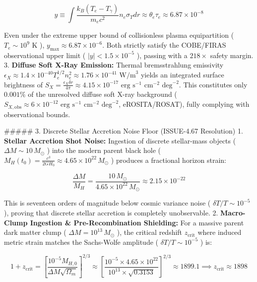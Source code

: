 \documentclass[11pt,a4paper]{article}
\theoremstyle{definition}
\theoremstyle{remark}
\begin{document}
\begin{equation}
y \equiv \int \frac{k_B (T_e - T_\gamma)}{m_e c^2} n_e \sigma_T dr \approx \theta_e \tau_e \approx 6.87 \times 10^{-8}
\end{equation}


Even under the extreme upper bound of collisionless plasma equipartition ( $T_e \sim 10^9\text{ K}$ ), $y_{\text{max}} \approx 6.87 \times 10^{-6}$. Both strictly satisfy the COBE/FIRAS observational upper limit ( $|y| < 1.5 \times 10^{-5}$ ), passing with a $218\times$ safety margin.
3. \textbf{Diffuse Soft X-Ray Emission:} Thermal bremsstrahlung emissivity $\epsilon_X \approx 1.4 \times 10^{-40} T_e^{1/2} n_e^2 \approx 1.76 \times 10^{-41}\text{ W/m}^3$ yields an integrated surface brightness of $S_X = \frac{\epsilon_X \delta r}{4\pi} \approx 4.15 \times 10^{-17}\text{ erg s}^{-1}\text{ cm}^{-2}\text{ deg}^{-2}$. This constitutes only $0.001\%$ of the unresolved diffuse soft X-ray background ( $S_{X, \text{obs}} \approx 6 \times 10^{-12}\text{ erg s}^{-1}\text{ cm}^{-2}\text{ deg}^{-2}$, eROSITA/ROSAT), fully complying with observational bounds.

\#\#\#\#\# 3. Discrete Stellar Accretion Noise Floor (ISSUE-4.67 Resolution)
1. \textbf{Stellar Accretion Shot Noise:} Ingestion of discrete stellar-mass objects ( $\Delta M \sim 10 \, M_\odot$ ) into the modern parent black hole ( $M_H(t_0) = \frac{c^3}{2 G H_0} \approx 4.65 \times 10^{22} \, M_\odot$ ) produces a fractional horizon strain:


\begin{equation}
\frac{\Delta M}{M_H} = \frac{10 \, M_\odot}{4.65 \times 10^{22} \, M_\odot} \approx 2.15 \times 10^{-22}
\end{equation}


This is seventeen orders of magnitude below cosmic variance noise ( $\delta T/T \sim 10^{-5}$ ), proving that discrete stellar accretion is completely unobservable.
2. \textbf{Macro-Clump Ingestion \& Pre-Recombination Shielding:} For a massive parent dark matter clump ( $\Delta M = 10^{13} \, M_\odot$ ), the critical redshift $z_{\text{crit}}$ where induced metric strain matches the Sachs-Wolfe amplitude ( $\delta T/T \sim 10^{-5}$ ) is:


\begin{equation}
1 + z_{\text{crit}} = \left[\frac{10^{-5} M_{H, 0}}{\Delta M \sqrt{\Omega_m}}\right]^{2/3} \approx \left[\frac{10^{-5} \times 4.65 \times 10^{22}}{10^{13} \times \sqrt{0.3153}}\right]^{2/3} \approx 1899.1 \implies z_{\text{crit}} \approx 1898
\end{equation}
\end{document}
